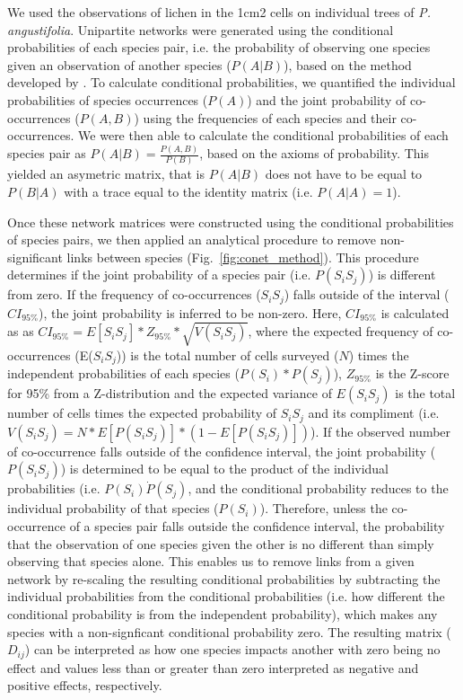 \documentclass[9pt,twocolumn,twoside,lineno]{pnas-new}
\begin{document}
{We used the observations of lichen in the 1cm2 cells on individual
trees of \textit{P. angustifolia}. Unipartite networks were generated
using the conditional probabilities of each species pair, i.e. the
probability of observing one species given an observation of another
species ($P(A | B)$), based on the method developed by
\citep{Araujo2011}. To calculate conditional probabilities, we
quantified the individual probabilities of species occurrences
($P(A)$) and the joint probability of co-occurrences ($P(A,B)$) using
the frequencies of each species and their co-occurrences. We were then
able to calculate the conditional probabilities of each species pair
as $P(A|B) = \frac{P(A,B)}{P(B)}$, based on the axioms of
probability. This yielded an asymetric matrix, that is $P(A|B)$ does
not have to be equal to $P(B|A)$ with a trace equal to the identity
matrix (i.e. $P(A|A) = 1$). 

Once these network matrices were constructed using the conditional
probabilities of species pairs, we then applied an analytical
procedure to remove non-significant links between species
(Fig.~\ref{fig:conet_method}). This procedure determines if the joint
probability of a species pair (i.e. $P(S_iS_j)$) is different from
zero.  If the frequency of co-occurrences ($S_iS_j$) falls outside of
the interval ($CI_{95\%}$), the joint probability is inferred to be
non-zero. Here, $CI_{95\%}$ is calculated as as $CI_{95\%} = E[S_iS_j]
* Z_{95\%} * \sqrt{V(S_iS_j)}$, where the expected frequency of
co-occurrences (E($S_iS_j$)) is the total number of cells surveyed
($N$) times the independent probabilities of each species ($P(S_i) *
P(S_j)$), $Z_{95\%}$ is the Z-score for 95\% from a Z-distribution and
the expected variance of $E(S_iS_j)$ is the total number of cells
times the expected probability of $S_iS_j$ and its compliment
(i.e. $V(S_iS_j) = N * E[P(S_iS_j)] * (1 - E[P(S_iS_j)])$). If the
observed number of co-occurrence falls outside of the confidence
interval, the joint probability ($P(S_iS_j)$) is determined to be
equal to the product of the individual probabilities (i.e. $P(S_i)
\dot P(S_j)$, and the conditional probability reduces to the
individual probability of that species ($P(S_i)$). Therefore, unless
the co-occurrence of a species pair falls outside the confidence
interval, the probability that the observation of one species given
the other is no different than simply observing that species
alone. This enables us to remove links from a given network by
re-scaling the resulting conditional probabilities by subtracting the
individual probabilities from the conditional probabilities (i.e. how
different the conditional probability is from the independent
probability), which makes any species with a non-signficant
conditional probability zero. The resulting matrix ($D_{ij}$) can be
interpreted as how one species impacts another with zero being no
effect and values less than or greater than zero interpreted as
negative and positive effects, respectively.


}
\end{document}

